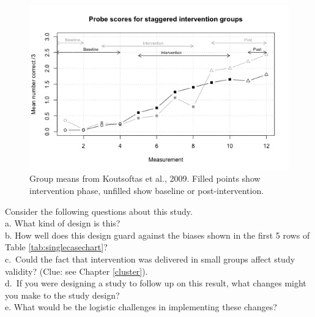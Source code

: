 \documentclass{krantz}
\begin{document}
\begin{figure}
\includegraphics[width=0.85\linewidth]{images_bw/kdataplot} \caption{Group means from Koutsoftas et al., 2009. Filled points show intervention phase, unfilled show baseline or post-intervention.}\label{fig:kdataplot}
\end{figure} 

Consider the following questions about this study.\\
a. What kind of design is this?\\
b. How well does this design guard against the biases shown in the first 5 rows of Table \ref{tab:singlecasechart}?\\
c.~Could the fact that intervention was delivered in small groups affect study validity? (Clue: see Chapter \ref{cluster}).\\
d.~If you were designing a study to follow up on this result, what changes might you make to the study design?\\
e. What would be the logistic challenges in implementing these changes?
\end{document}

